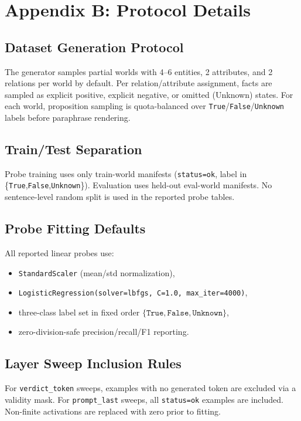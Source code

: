 \documentclass[11pt]{article}
\begin{document}
\section{Appendix B: Protocol Details}
\subsection{Dataset Generation Protocol}
The generator samples partial worlds with 4--6 entities, 2 attributes, and 2 relations per world by default.
Per relation/attribute assignment, facts are sampled as explicit positive, explicit negative, or omitted (Unknown) states.
For each world, proposition sampling is quota-balanced over \texttt{True}/\texttt{False}/\texttt{Unknown} labels before paraphrase rendering.

\subsection{Train/Test Separation}
Probe training uses only train-world manifests (\texttt{status=ok}, label in \{\texttt{True},\texttt{False},\texttt{Unknown}\}).
Evaluation uses held-out eval-world manifests.
No sentence-level random split is used in the reported probe tables.

\subsection{Probe Fitting Defaults}
All reported linear probes use:
\begin{itemize}
  \item \texttt{StandardScaler} (mean/std normalization),
  \item \texttt{LogisticRegression(solver=lbfgs, C=1.0, max\_iter=4000)},
  \item three-class label set in fixed order \(\{\texttt{True},\texttt{False},\texttt{Unknown}\}\),
  \item zero-division-safe precision/recall/F1 reporting.
\end{itemize}

\subsection{Layer Sweep Inclusion Rules}
For \texttt{verdict\_token} sweeps, examples with no generated token are excluded via a validity mask.
For \texttt{prompt\_last} sweeps, all \texttt{status=ok} examples are included.
Non-finite activations are replaced with zero prior to fitting.
\end{document}

